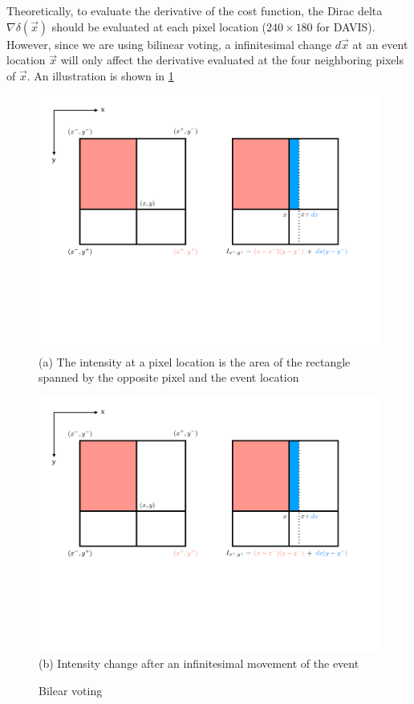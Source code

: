 Theoretically, to evaluate the derivative of the cost function, the
Dirac delta $\nabla\delta(\vec{x})$ should be evaluated at each pixel
location ($240\times180$ for DAVIS). However, since we are using
bilinear voting, a infinitesimal change $d\vec{x}$ at an event
location $\vec{x}$ will only affect the derivative evaluated at the
four neighboring pixels of $\vec{x}$. An illustration is shown in
\cref{fig:bi_voting}

\begin{figure}
  \begin{minipage}[t]{0.48\textwidth}
    \centering \includegraphics[trim={1cm 7cm 18cm 1cm},clip,width =
    \textwidth]{images/bi_voting.pdf}
    (a) The intensity at a pixel
    location is the area of the rectangle spanned by the opposite
    pixel and the event location
  \end{minipage}
  \hfill
  \begin{minipage}[t]{0.48\textwidth}
    \centering \includegraphics[trim={18cm 7cm 1cm 1cm},clip,width =
    \textwidth]{images/bi_voting.pdf} (b) Intensity change after an
    infinitesimal movement of the event
  \end{minipage}
  \caption{Bilear voting}
  \label{fig:bi_voting}
\end{figure}
